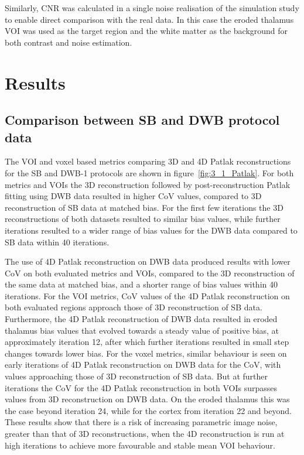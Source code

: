 Similarly, CNR was calculated in a single noise realisation of the simulation study to enable direct comparison with the real data. In this case the eroded thalamus VOI was used as the target region and the white matter as the background for both contrast and noise estimation. 


\section*{Results}
 
\subsection*{Comparison between SB and DWB protocol data}
The VOI and voxel based metrics comparing 3D and 4D Patlak reconstructions for the SB and DWB-1 protocols are shown in figure~\ref{fig:3_1_Patlak}. For both metrics and VOIs the 3D reconstruction followed by post-reconstruction Patlak fitting using DWB data resulted in higher CoV values, compared to 3D reconstruction of SB data at matched bias. For the first few iterations the 3D reconstructions of both datasets resulted to similar bias values, while further iterations resulted to a wider range of bias values for the DWB data compared to SB data within 40 iterations.

The use of 4D Patlak reconstruction on DWB data produced results with lower CoV on both evaluated metrics and VOIs, compared to the 3D reconstruction of the same data at matched bias, and a shorter range of bias values within 40 iterations.
For the VOI metrics, CoV values of the 4D Patlak reconstruction on both evaluated regions approach those of 3D reconstruction of SB data. Furthermore, the 4D Patlak reconstruction of DWB data resulted in eroded thalamus bias values that evolved towards a steady value of positive bias, at approximately iteration 12, after which further iterations resulted in small step changes towards lower bias. 
For the voxel metrics, similar behaviour is seen on early iterations of 4D Patlak reconstruction on DWB data for the CoV, with values approaching those of 3D reconstruction of SB data. But at further iterations the CoV for the 4D Patlak reconstruction in both VOIs surpasses values from 3D reconstruction on DWB data. On the eroded thalamus this was the case beyond iteration 24, while for the cortex from iteration 22 and beyond. These results show that there is a risk of increasing parametric image noise, greater than that of 3D reconstructions, when the 4D reconstruction is run at high iterations to achieve more favourable and stable mean VOI behaviour.

